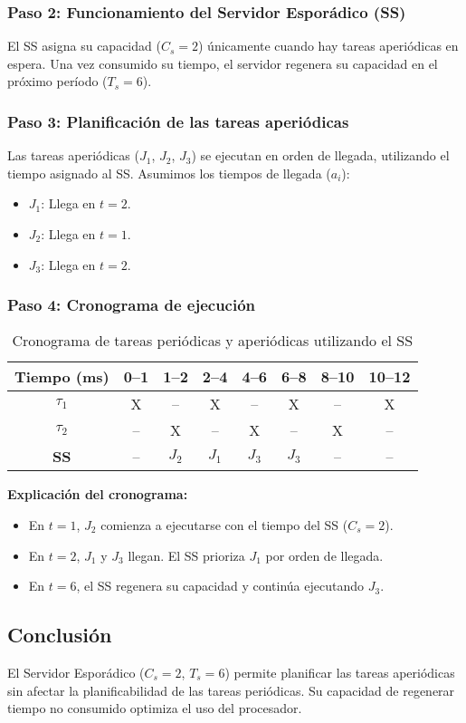 \documentclass[a4paper,12pt]{article}
\begin{document}
\subsubsection{Paso 2: Funcionamiento del Servidor Esporádico (SS)}
El SS asigna su capacidad (\(C_s = 2\)) únicamente cuando hay tareas aperiódicas en espera. Una vez consumido su tiempo, el servidor regenera su capacidad en el próximo período (\(T_s = 6\)).

\subsubsection{Paso 3: Planificación de las tareas aperiódicas}
Las tareas aperiódicas (\(J_1\), \(J_2\), \(J_3\)) se ejecutan en orden de llegada, utilizando el tiempo asignado al SS. Asumimos los tiempos de llegada (\(a_i\)):
\begin{itemize}
    \item \(J_1\): Llega en \(t = 2\).
    \item \(J_2\): Llega en \(t = 1\).
    \item \(J_3\): Llega en \(t = 2\).
\end{itemize}

\subsubsection{Paso 4: Cronograma de ejecución}
\begin{table}[H]
\centering
\begin{tabular}{|c|c|c|c|c|c|c|c|}
\hline
\textbf{Tiempo (ms)} & 0--1 & 1--2 & 2--4 & 4--6 & 6--8 & 8--10 & 10--12 \\ \hline
\textbf{\(\tau_1\)} & X & -- & X & -- & X & -- & X \\ \hline
\textbf{\(\tau_2\)} & -- & X & -- & X & -- & X & -- \\ \hline
\textbf{SS} & -- & \(J_2\) & \(J_1\) & \(J_3\) & \(J_3\) & -- & -- \\ \hline
\end{tabular}
\caption{Cronograma de tareas periódicas y aperiódicas utilizando el SS}
\end{table}

\textbf{Explicación del cronograma:}
\begin{itemize}
    \item En \(t = 1\), \(J_2\) comienza a ejecutarse con el tiempo del SS (\(C_s = 2\)).
    \item En \(t = 2\), \(J_1\) y \(J_3\) llegan. El SS prioriza \(J_1\) por orden de llegada.
    \item En \(t = 6\), el SS regenera su capacidad y continúa ejecutando \(J_3\).
\end{itemize}

\subsection{Conclusión}
El Servidor Esporádico (\(C_s = 2\), \(T_s = 6\)) permite planificar las tareas aperiódicas sin afectar la planificabilidad de las tareas periódicas. Su capacidad de regenerar tiempo no consumido optimiza el uso del procesador.
\end{document}
